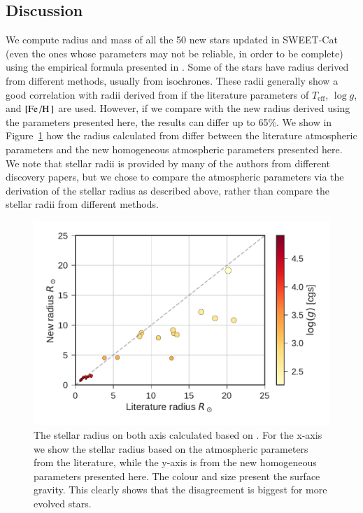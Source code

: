 \documentclass{aa}
\begin{document}
\subsection{Discussion}
\label{sec:Discussion}
We compute radius and mass of all the 50 new stars updated in SWEET-Cat (even
the ones whose parameters may not be reliable, in order to be complete) using
the empirical formula presented in \citet{Torres2010}. Some of the stars have
radius derived from different methods, usually from isochrones. These radii
generally show a good correlation with radii derived from \citet{Torres2010} if
the literature parameters of $T_\mathrm{eff}$, $\log g$, and
$[\ion{Fe}/\ion{H}]$ are used. However, if we compare with the new radius
derived using the parameters presented here, the results can differ up to 65\%.
We show in Figure~\ref{fig:RR} how the radius calculated from \citet{Torres2010}
differ between the literature atmospheric parameters and the new homogeneous
atmospheric parameters presented here. We note that stellar radii is provided by
many of the authors from different discovery papers, but we chose to compare the
atmospheric parameters via the derivation of the stellar radius as described
above, rather than compare the stellar radii from different methods.

\begin{figure}[tpb]
    \centering
    \includegraphics[width=1.0\linewidth]{figures/radiusVSradius.pdf}
    \caption{The stellar radius on both axis calculated based on \citet{Torres2010}.
    For the x-axis we show the stellar radius based on the atmospheric parameters
    from the literature, while the y-axis is from the new homogeneous parameters
    presented here. The colour and size present the surface gravity. This clearly
    shows that the disagreement is biggest for more evolved stars.}
    \label{fig:RR}
\end{figure}
\end{document}
